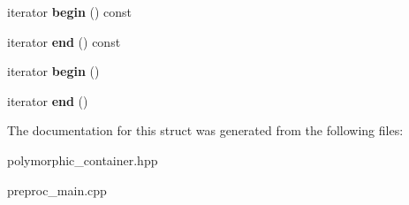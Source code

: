 \begin{DoxyCompactItemize}
\item 
\hypertarget{structtml_1_1runtime_1_1poly__container_a86182337dc8efa2eb0c70fb33cafaea8}{iterator {\bfseries begin} () const }\label{structtml_1_1runtime_1_1poly__container_a86182337dc8efa2eb0c70fb33cafaea8}

\item 
\hypertarget{structtml_1_1runtime_1_1poly__container_a4e7b393130762aafc42796e4cbd2c87d}{iterator {\bfseries end} () const }\label{structtml_1_1runtime_1_1poly__container_a4e7b393130762aafc42796e4cbd2c87d}

\item 
\hypertarget{structtml_1_1runtime_1_1poly__container_ab0a92141bafe2619269d1d35913e16b9}{iterator {\bfseries begin} ()}\label{structtml_1_1runtime_1_1poly__container_ab0a92141bafe2619269d1d35913e16b9}

\item 
\hypertarget{structtml_1_1runtime_1_1poly__container_a70bfb6ca4a48aa83aff52035f6ee3ac9}{iterator {\bfseries end} ()}\label{structtml_1_1runtime_1_1poly__container_a70bfb6ca4a48aa83aff52035f6ee3ac9}

\end{DoxyCompactItemize}


The documentation for this struct was generated from the following files\+:\begin{DoxyCompactItemize}
\item 
polymorphic\+\_\+container.\+hpp\item 
preproc\+\_\+main.\+cpp\end{DoxyCompactItemize}
